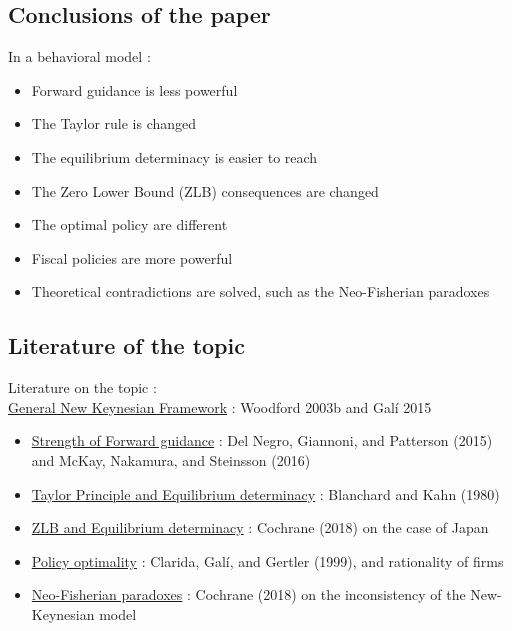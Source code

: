 \documentclass{beamer}
\begin{document}
\subsection{Conclusions of the paper}
\begin{frame}{\subsecname}
    In a behavioral model :
    \begin{itemize}
        \item Forward guidance is less powerful
        \item The Taylor rule is changed
        \item The equilibrium determinacy is easier to reach
        \item The Zero Lower Bound (ZLB) consequences are changed
        \item The optimal policy are different
        \item Fiscal policies are more powerful
        \item Theoretical contradictions are solved, such as the Neo-Fisherian paradoxes
    \end{itemize}
\end{frame}

\subsection{Literature of the topic}
\begin{frame}{\subsecname}
    Literature on the topic : \\
    \underline{General New Keynesian Framework} : Woodford 2003b and Galí 2015 \\
    \begin{itemize}
        \item \underline{Strength of Forward guidance} : Del Negro, Giannoni, and Patterson (2015) and McKay, Nakamura, and Steinsson (2016)
        \item \underline{Taylor Principle and Equilibrium determinacy} : Blanchard and Kahn (1980)
        \item \underline{ZLB and Equilibrium determinacy} : Cochrane (2018) on the case of Japan
        \item \underline{Policy optimality} : Clarida, Galí, and Gertler (1999), and rationality of firms
        \item \underline{Neo-Fisherian paradoxes} : Cochrane (2018) on the inconsistency of the New-Keynesian model
    \end{itemize}
\end{frame}
\end{document}
